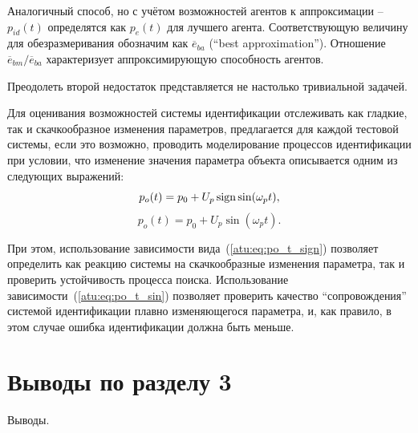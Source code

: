 Аналогичный способ, но с учётом возможностей агентов
к аппроксимации -- $p_{id}(t)$ определятся
как $p_e(t)$ для лучшего агента.
Соответствующую величину для обезразмеривания обозначим как
$\overline{e}_{ba}$ (``best approximation'').
Отношение $\overline{e}_{bm} / \overline{e}_{ba}$
характеризует аппроксимирующую способность агентов.


Преодолеть второй недостаток представляется не настолько тривиальной задачей.


Для оценивания возможностей системы идентификации
отслеживать как гладкие, так и скачкообразное изменения параметров,
предлагается для каждой тестовой системы, если это возможно,
проводить моделирование процессов идентификации при условии, что
изменение значения параметра объекта описывается одним из
следующих выражений:
%
\begin{equation}
  p_o(t) = p_0 +  U_{p} \operatorname*{sign} \sin( \omega_{p} t ),
  \label{atu:eq:po_t_sign}
\end{equation}
%
%
\begin{equation}
  p_o(t) = p_0 +  U_{p} \sin( \omega_{p} t ).
  \label{atu:eq:po_t_sin}
\end{equation}


При этом, использование зависимости вида~(\ref{atu:eq:po_t_sign})
позволяет определить как реакцию системы на скачкообразные
изменения параметра, так и проверить устойчивость процесса поиска.
Использование зависимости~(\ref{atu:eq:po_t_sin}) позволяет проверить
качество ``сопровождения'' системой идентификации плавно изменяющегося параметра,
и, как правило, в этом случае ошибка идентификации должна быть меньше.








\section{Выводы по разделу 3}

Выводы.

